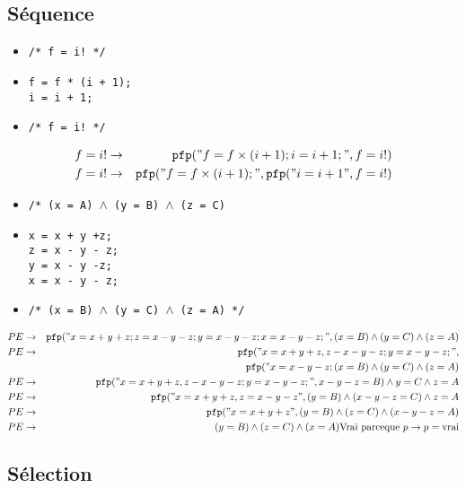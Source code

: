 	\subsection{Séquence}
	\begin{itemize}
		\item \texttt{/* f = i! */}
		\item \texttt{f = f * (i + 1);\\i = i + 1;}
		\item \texttt{/* f = i! */}
	\end{itemize}
	\begin{eqnarray*}
		f = i! &\rightarrow& \texttt{pfp}("f = f\times (i+1); i = i +1;", f= i!)\\
		f=i!&\rightarrow&\texttt{pfp}("f=f\times(i+1);",\texttt{pfp}("i=i+1",f=i!)\\
	\end{eqnarray*}
	\begin{itemize}
		\item \texttt{/* (x = A) $\wedge$ (y = B) $\wedge$ (z = C)}
		\item \texttt{x = x + y +z;\\z = x - y - z;\\y = x - y -z;\\x = x - y - z;}
		\item \texttt{/* (x = B) $\wedge$ (y = C) $\wedge$ (z = A) */}
	\end{itemize}
	\begin{eqnarray*}
		PE &\rightarrow& \texttt{pfp}("x=x+y+z;z=x-y-z;y=x-y-z;x=x-y-z;", (x=B)\wedge(y=C)\wedge(z=A)\\
		PE &\rightarrow& \texttt{pfp}("x=x+y+z, z-x-y-z;y=x-y-z;", \\&&\texttt{pfp}("x=x-y-z;(x=B)\wedge(y=C)\wedge(z=A)\\
		PE &\rightarrow& \texttt{pfp}("x=x+y+z, z-x-y-z;y=x-y-z;", x-y-z=B)\wedge y=C \wedge z = A\\
		PE &\rightarrow& \texttt{pfp}("x=x+y+z,z=x-y-z", (y=B)\wedge (x-y-z=C)\wedge z = A\\
		PE &\rightarrow& \texttt{pfp}("x=x+y+z", (y=B)\wedge (z=C) \wedge (x-y-z=A)\\
		PE &\rightarrow& (y=B) \wedge (z=C)\wedge(x=A) \textmd{Vrai parceque }p\rightarrow p = \textmd{vrai}
	\end{eqnarray*}
	
	\subsection{Sélection} \label{pfpSequence}
